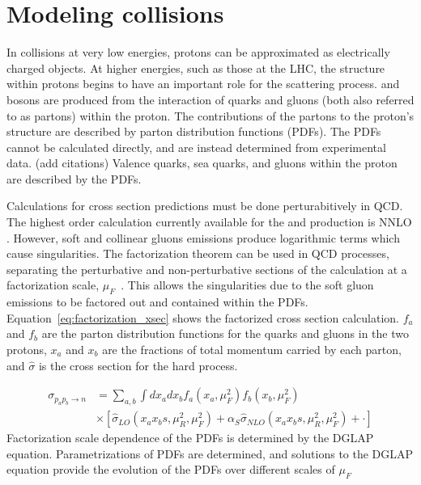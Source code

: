 \section{Modeling \pp collisions}
In collisions at very low energies, protons can be approximated as electrically charged objects. At higher energies, such as those at the LHC, the structure within protons begins to have an important role for the scattering process. \W and \Z bosons are produced from the interaction of quarks and gluons (both also referred to as partons) within the proton\cite{PhysRevLett.23.930,PhysRevLett.23.935}. The contributions of the partons to the proton's structure are described by parton distribution functions (PDFs). The PDFs cannot be calculated directly, and are instead determined from experimental data.  (add citations) Valence quarks, sea quarks, and gluons within the proton are described by the PDFs. 

Calculations for cross section predictions must be done perturabitively in QCD. The highest order calculation currently available for the \W and \Z production is NNLO
\cite{Anastasiou:2003ds}. However, soft and collinear gluons emissions produce logarithmic terms which cause singularities. The factorization theorem can be used in QCD processes, separating the perturbative and non-perturbative sections of the calculation at a factorization scale, $\mu_F$~\cite{Collins:1989gx}. This allows the singularities due to the soft gluon emissions to be factored out and contained within the PDFs.  Equation~\ref{eq:factorization_xsec} shows the factorized cross section calculation. $f_{a}$ and $f_{b}$ are the parton distribution functions for the quarks and gluons in the two protons, $x_a$ and $x_b$ are the fractions of total momentum carried by each parton, and $\hat{\sigma}$ is the cross section for the hard process. 

\begin{equation}
\begin{aligned}
\sigma_{p_a p_b \rightarrow n} &= \sum_{a,b}{\int{dx_a dx_b f_{a}(x_a, \mu^2_F)f_{b}(x_b, \mu^2_F)}} \\ &\times[\hat{\sigma}_{LO}(x_a x_b s, \mu^2_R, \mu^2_F)+\alpha_S \hat{\sigma}_{NLO}(x_a x_b s, \mu^2_R, \mu^2_F) + \cdot]
    \label{eq:factorization_xsec}
\end{aligned}
\end{equation}
Factorization scale dependence of the PDFs is determined by the DGLAP equation. Parametrizations of PDFs are determined, and solutions to the DGLAP equation provide the evolution of the PDFs over different scales of $\mu_F$ \cite{Gribov:1972ri,Dokshitzer:1977sg}

